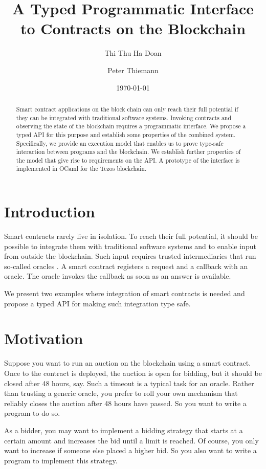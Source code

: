 \documentclass[a4paper]{llncs}
\title{A Typed Programmatic Interface to Contracts on the Blockchain}
\author{Thi Thu Ha Doan\and
Peter Thiemann\orcidID{0000-0002-9000-1239}}
\institute{University of Freiburg, Germany\\
\email{\{doanha,thiemann\}@informatik.uni-freiburg.de}
}
\date{\today}
\begin{document}
\maketitle
\pagestyle{plain}
\begin{abstract}
  Smart contract applications on the block chain can only reach their full potential if
  they can be integrated with traditional software systems. Invoking
  contracts and observing the state of the blockchain requires a
  programmatic interface. We propose a typed API for this
  purpose and establish some properties of the combined
  system. Specifically, we provide an execution model that
  enables us to prove type-safe interaction between programs and the 
  blockchain. We establish further properties of the model that
  give rise to requirements on the API. A prototype of the interface
  is implemented in OCaml for the Tezos blockchain.
\end{abstract}

\section{Introduction}
\label{sec:introduction}

Smart contracts rarely live in isolation. To reach their full
potential, it should be possible to integrate them with traditional
software systems and to enable input from outside the blockchain. Such
input requires trusted intermediaries that run so-called oracles \cite{oracles}. A
smart contract registers a request and a callback with an oracle. The
oracle invokes the callback as soon as an answer is available. 

We present two examples where integration of smart contracts is needed
and propose a typed API for making such integration type safe.

\section{Motivation}
\label{sec:motivation}

Suppose you want to run an auction on the blockchain using a smart
contract. Once to the contract is deployed, the
auction is open for bidding, but it should be closed after 48 hours,
say. Such a timeout is a typical task for an oracle. Rather than
trusting a generic oracle, you prefer to roll your own mechanism that reliably closes the auction
after 48 hours have passed. So you want to write a program to do so. 

As a bidder, you may want to implement a bidding
strategy that starts at a certain amount and increases the bid until a
limit is reached. Of course, you only want to increase if
someone else placed a higher bid. So you also want to write a
program to implement this strategy.
\end{document}
